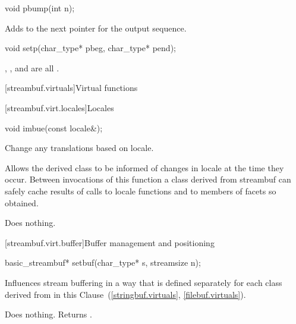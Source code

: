 %
\begin{itemdecl}
void pbump(int n);
\end{itemdecl}

\begin{itemdescr}
\pnum
\effects
Adds  to the next pointer for the output sequence.
\end{itemdescr}

%
\begin{itemdecl}
void setp(char_type* pbeg, char_type* pend);
\end{itemdecl}

\begin{itemdescr}
\pnum
\ensures
{},
,
and
 are all .
\end{itemdescr}

[streambuf.virtuals]{Virtual functions}

[streambuf.virt.locales]{Locales}

%
\begin{itemdecl}
void imbue(const locale&);
\end{itemdecl}

\begin{itemdescr}
\pnum
\effects
Change any translations based on locale.

\pnum
\remarks
Allows the derived class to be informed of changes in locale at the
time they occur.
Between invocations of this function a class derived
from streambuf can safely cache results of calls to locale functions
and to members of facets so obtained.

\pnum
{}
Does nothing.
\end{itemdescr}

[streambuf.virt.buffer]{Buffer management and positioning}

%
\begin{itemdecl}
basic_streambuf* setbuf(char_type* s, streamsize n);
\end{itemdecl}

\begin{itemdescr}
\pnum
\effects
Influences stream buffering in a way that is defined separately for each class
derived from
in this Clause~(\ref{stringbuf.virtuals},
\ref{filebuf.virtuals}).

\pnum
{}
Does nothing.
Returns
.
\end{itemdescr}


